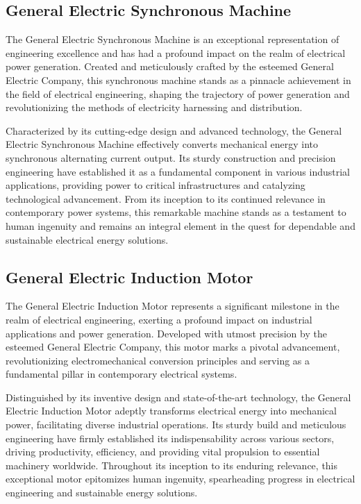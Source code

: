 \subsection{General Electric Synchronous Machine}
The General Electric Synchronous Machine is an exceptional representation of engineering excellence and has had a profound impact on the realm of electrical power generation. Created and meticulously crafted by the esteemed General Electric Company, this synchronous machine stands as a pinnacle achievement in the field of electrical engineering, shaping the trajectory of power generation and revolutionizing the methods of electricity harnessing and distribution.

Characterized by its cutting-edge design and advanced technology, the General Electric Synchronous Machine effectively converts mechanical energy into synchronous alternating current output. Its sturdy construction and precision engineering have established it as a fundamental component in various industrial applications, providing power to critical infrastructures and catalyzing technological advancement. From its inception to its continued relevance in contemporary power systems, this remarkable machine stands as a testament to human ingenuity and remains an integral element in the quest for dependable and sustainable electrical energy solutions.
\subsection{General Electric Induction Motor}
The General Electric Induction Motor represents a significant milestone in the realm of electrical engineering, exerting a profound impact on industrial applications and power generation. Developed with utmost precision by the esteemed General Electric Company, this motor marks a pivotal advancement, revolutionizing electromechanical conversion principles and serving as a fundamental pillar in contemporary electrical systems.

Distinguished by its inventive design and state-of-the-art technology, the General Electric Induction Motor adeptly transforms electrical energy into mechanical power, facilitating diverse industrial operations. Its sturdy build and meticulous engineering have firmly established its indispensability across various sectors, driving productivity, efficiency, and providing vital propulsion to essential machinery worldwide. Throughout its inception to its enduring relevance, this exceptional motor epitomizes human ingenuity, spearheading progress in electrical engineering and sustainable energy solutions.
